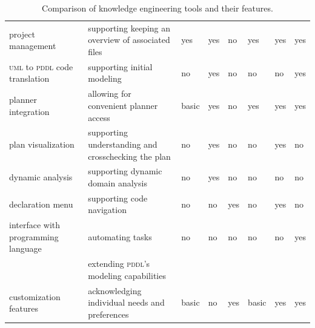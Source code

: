 \documentclass[runningheads]{llncs}
\newcommand{\pddl}{\textsc{pddl}\xspace}
\newcommand{\uml}{\textsc{uml}\xspace}
\begin{document}
\begin{table}
\begin{tabularx}{\textwidth}{lX|llll}
  project management                  & supporting keeping an overview of associated files    & yes                         & yes                       & no                            &   yes    & yes     & yes       \\
  \uml to \pddl code translation      & supporting initial modeling                           & no                          & yes                       & no                            &   no     & no      & yes       \\
  planner integration                 & allowing for convenient planner access                & basic                       & yes                       & no                            &   yes    & yes     & yes       \\
  plan visualization                  & supporting understanding and crosschecking the plan   & no                          & yes                       & no                            &   no     & yes     & no        \\
  dynamic analysis                    & supporting dynamic domain analysis                    & no                          & yes                       & no                            &   no     & no      & no        \\
  declaration menu                    & supporting code navigation                            & no                          & no                        & yes                           &   no     & yes     & no        \\
  interface with programming language & automating tasks                                      & no                          & no                        & no                            &   no     & no      & yes       \\
                                      & extending \pddl's modeling capabilities               &                             &                           &                               &          &      &              \\
  customization features              & acknowledging individual needs and preferences        & basic                       & no                        & yes                           &  basic   & yes     & yes       \\
\end{tabularx}\caption[Comparison of knowledge engineering
tools]{\label{tool-comp}Comparison of knowledge engineering tools and their features.}

\end{table}
\end{document}
